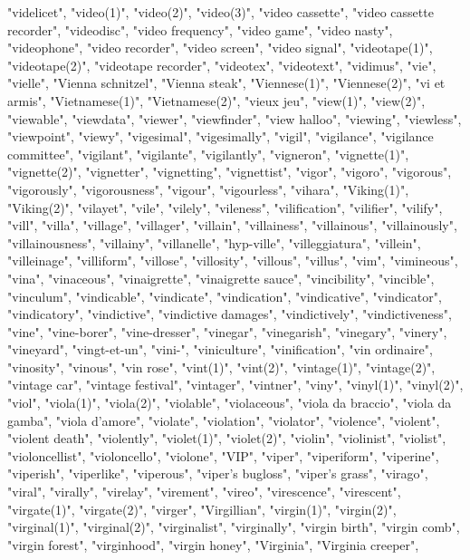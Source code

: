 "videlicet",
"video(1)",
"video(2)",
"video(3)",
"video cassette",
"video cassette recorder",
"videodisc",
"video frequency",
"video game",
"video nasty",
"videophone",
"video recorder",
"video screen",
"video signal",
"videotape(1)",
"videotape(2)",
"videotape recorder",
"videotex",
"videotext",
"vidimus",
"vie",
"vielle",
"Vienna schnitzel",
"Vienna steak",
"Viennese(1)",
"Viennese(2)",
"vi et armis",
"Vietnamese(1)",
"Vietnamese(2)",
"vieux jeu",
"view(1)",
"view(2)",
"viewable",
"viewdata",
"viewer",
"viewfinder",
"view halloo",
"viewing",
"viewless",
"viewpoint",
"viewy",
"vigesimal",
"vigesimally",
"vigil",
"vigilance",
"vigilance committee",
"vigilant",
"vigilante",
"vigilantly",
"vigneron",
"vignette(1)",
"vignette(2)",
"vignetter",
"vignetting",
"vignettist",
"vigor",
"vigoro",
"vigorous",
"vigorously",
"vigorousness",
"vigour",
"vigourless",
"vihara",
"Viking(1)",
"Viking(2)",
"vilayet",
"vile",
"vilely",
"vileness",
"vilification",
"vilifier",
"vilify",
"vill",
"villa",
"village",
"villager",
"villain",
"villainess",
"villainous",
"villainously",
"villainousness",
"villainy",
"villanelle",
"hyp-ville",
"villeggiatura",
"villein",
"villeinage",
"villiform",
"villose",
"villosity",
"villous",
"villus",
"vim",
"vimineous",
"vina",
"vinaceous",
"vinaigrette",
"vinaigrette sauce",
"vincibility",
"vincible",
"vinculum",
"vindicable",
"vindicate",
"vindication",
"vindicative",
"vindicator",
"vindicatory",
"vindictive",
"vindictive damages",
"vindictively",
"vindictiveness",
"vine",
"vine-borer",
"vine-dresser",
"vinegar",
"vinegarish",
"vinegary",
"vinery",
"vineyard",
"vingt-et-un",
"vini-",
"viniculture",
"vinification",
"vin ordinaire",
"vinosity",
"vinous",
"vin rose",
"vint(1)",
"vint(2)",
"vintage(1)",
"vintage(2)",
"vintage car",
"vintage festival",
"vintager",
"vintner",
"viny",
"vinyl(1)",
"vinyl(2)",
"viol",
"viola(1)",
"viola(2)",
"violable",
"violaceous",
"viola da braccio",
"viola da gamba",
"viola d'amore",
"violate",
"violation",
"violator",
"violence",
"violent",
"violent death",
"violently",
"violet(1)",
"violet(2)",
"violin",
"violinist",
"violist",
"violoncellist",
"violoncello",
"violone",
"VIP",
"viper",
"viperiform",
"viperine",
"viperish",
"viperlike",
"viperous",
"viper's bugloss",
"viper's grass",
"virago",
"viral",
"virally",
"virelay",
"virement",
"vireo",
"virescence",
"virescent",
"virgate(1)",
"virgate(2)",
"virger",
"Virgillian",
"virgin(1)",
"virgin(2)",
"virginal(1)",
"virginal(2)",
"virginalist",
"virginally",
"virgin birth",
"virgin comb",
"virgin forest",
"virginhood",
"virgin honey",
"Virginia",
"Virginia creeper",
